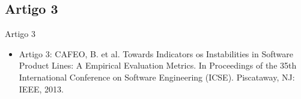 \subsection{Artigo 3}
\begin{frame}[t, fragile]{Artigo 3}
  \begin{itemize}
         \item \alert{Artigo 3}: CAFEO, B. et al. Towards Indicators os Instabilities in Software Product Lines: A Empirical Evaluation Metrics.  In Proceedings of the 35th International Conference on Software Engineering (ICSE). Piscataway, NJ: IEEE, 2013.
  \end{itemize}
\end{frame}